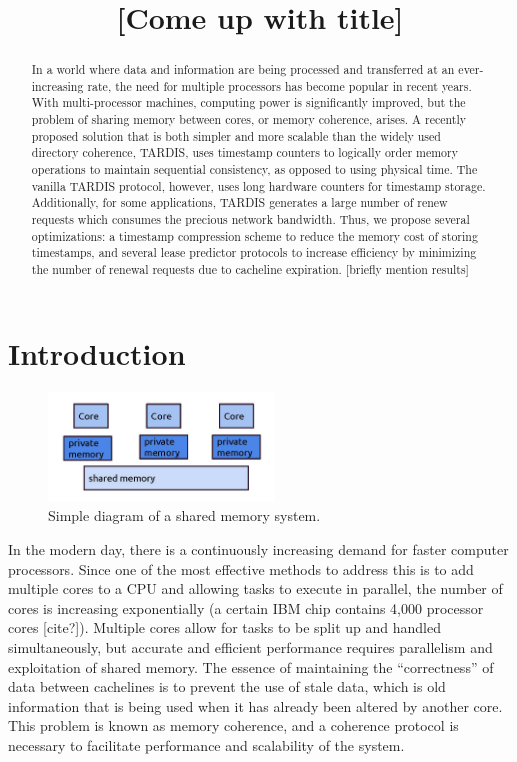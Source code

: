 \documentclass[12pt]{article}
\title{[Come up with title]}
\date{}
\begin{document}
	\maketitle

\begin{abstract}
In a world where data and information are being processed and transferred at an ever-increasing rate, the need for multiple processors has become popular in recent years. With multi-processor machines, computing power is significantly improved, but the problem of sharing memory between cores, or memory coherence, arises. A recently proposed solution that is both simpler and more scalable than the widely used directory coherence, TARDIS, uses timestamp counters to logically order memory operations to maintain sequential consistency, as opposed to using physical time. The vanilla TARDIS protocol, however, uses long hardware counters for timestamp storage. Additionally, for some applications, TARDIS generates a large number of renew requests which consumes the precious network bandwidth. Thus, we propose several optimizations: a timestamp compression scheme to reduce the memory cost of storing timestamps, and several lease predictor protocols to increase efficiency by minimizing the number of renewal requests due to cacheline expiration. [briefly mention results]
\end{abstract}


\section{Introduction}

\begin{figure}
\begin{center}
  \includegraphics[width=6cm]{multicores.jpg}
  \caption{Simple diagram of a shared memory system.}
  \label{fig:multicore}
\end{center}
\end{figure}

In the modern day, there is a continuously increasing demand for faster computer processors. Since one of the most effective methods to address this is to add multiple cores to a CPU and allowing tasks to execute in parallel, the number of cores is increasing exponentially (a certain IBM chip contains 4,000 processor cores [cite?]). Multiple cores allow for tasks to be split up and handled simultaneously, but accurate and efficient performance requires parallelism and exploitation of shared memory. The essence of maintaining the “correctness” of data between cachelines is to prevent the use of stale data, which is old information that is being used when it has already been altered by another core. This problem is known as memory coherence, and a coherence protocol is necessary to facilitate performance and scalability of the system.
\end{document}
